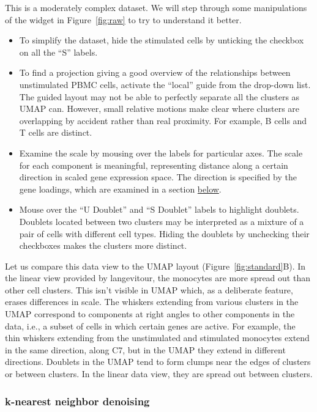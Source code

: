 This is a moderately complex dataset. We will step through some manipulations of the widget in Figure~\ref{fig:raw} to try to understand it better.

\begin{itemize}
\item
  To simplify the dataset, hide the stimulated cells by unticking the checkbox on all the ``S'' labels.
\item
  To find a projection giving a good overview of the relationships between unstimulated PBMC cells, activate the ``local'' guide from the drop-down list. The guided layout may not be able to perfectly separate all the clusters as UMAP can. However, small relative motions make clear where clusters are overlapping by accident rather than real proximity. For example, B cells and T cells are distinct.
\item
  Examine the scale by mousing over the labels for particular axes. The scale for each component is meaningful, representing distance along a certain direction in scaled gene expression space. The direction is specified by the gene loadings, which are examined in a section \protect\hyperlink{geneloadings}{below}.
\item
  Mouse over the ``U Doublet'' and ``S Doublet'' labels to highlight doublets. Doublets located between two clusters may be interpreted as a mixture of a pair of cells with different cell types. Hiding the doublets by unchecking their checkboxes makes the clusters more distinct.
\end{itemize}

Let us compare this data view to the UMAP layout (Figure~\ref{fig:standard}B). In the linear view provided by langevitour, the monocytes are more spread out than other cell clusters. This isn't visible in UMAP which, as a deliberate feature, erases differences in scale. The whiskers extending from various clusters in the UMAP correspond to components at right angles to other components in the data, i.e., a subset of cells in which certain genes are active. For example, the thin whiskers extending from the unstimulated and stimulated monocytes extend in the same direction, along C7, but in the UMAP they extend in different directions. Doublets in the UMAP tend to form clumps near the edges of clusters or between clusters. In the linear data view, they are spread out between clusters.

\hypertarget{k-nearest-neighbor-denoising}{%
\subsubsection{k-nearest neighbor denoising}\label{k-nearest-neighbor-denoising}}

